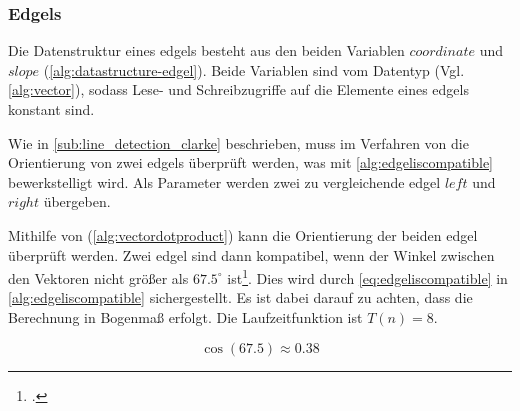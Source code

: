 \subsubsection{Edgels} %
\label{sub:datenstruktur-edgels}

Die Datenstruktur eines \glspl{edgel} besteht aus den beiden Variablen $\mathit{coordinate}$ und $\mathit{slope}$
 (\autoref{alg:datastructure-edgel}). Beide Variablen sind vom Datentyp  (Vgl.
 \autoref{alg:vector}), sodass Lese- und Schreibzugriffe auf die Elemente eines \glspl{edgel} konstant sind.


Wie in \autoref{sub:line_detection_clarke} beschrieben, muss im Verfahren von \citeauthor{hirzer08} die Orientierung
 von zwei \glspl{edgel} überprüft werden, was mit \autoref{alg:edgeliscompatible} bewerkstelligt wird. Als Parameter
 werden zwei zu vergleichende \gls{edgel} $\mathit{left}$ und $\mathit{right}$ übergeben.

Mithilfe von  (\autoref{alg:vectordotproduct}) kann die Orientierung der beiden \gls{edgel}
 überprüft werden. Zwei \gls{edgel} sind dann kompatibel, wenn der Winkel zwischen den Vektoren nicht größer als
 $67.5^\circ$ ist\footcite[Vgl.][S.~417]{clarke96}. Dies wird durch \autoref{eq:edgeliscompatible} in
 \autoref{alg:edgeliscompatible} sichergestellt. Es ist dabei darauf zu achten, dass die Berechnung in Bogenmaß
 erfolgt. Die Laufzeitfunktion ist $T(n) = 8$.

\begin{equation}
	\label{eq:edgeliscompatible}
	\cos \left(67.5\right) \approx 0.38
\end{equation}

